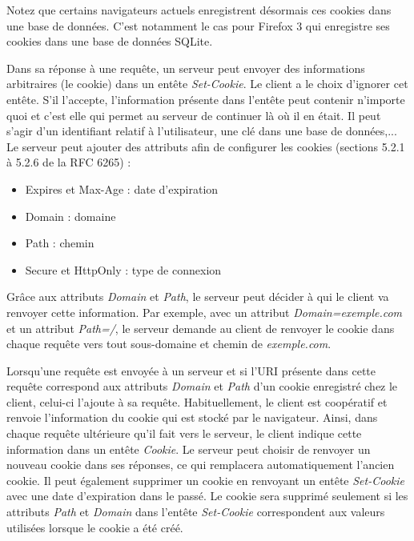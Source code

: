 Notez que certains navigateurs actuels enregistrent désormais ces cookies dans une base de données. C'est notamment le cas pour Firefox 3 qui enregistre ses cookies dans une base de données SQLite.
\newline

Dans sa réponse à une requête, un serveur peut envoyer des informations arbitraires (le cookie) dans un entête \textit{Set-Cookie}. Le client a le choix d'ignorer cet entête. S'il l'accepte, l'information présente dans l'entête peut contenir n'importe quoi et c'est elle qui permet au serveur de continuer là où il en était. Il peut s'agir d'un identifiant relatif à l'utilisateur, une clé dans une base de données,...
Le serveur peut ajouter des attributs afin de configurer les cookies (sections 5.2.1 à 5.2.6 de la RFC 6265) \cite{IETF_RFC6265} :

\begin{itemize}
	\item Expires et Max-Age : date d'expiration
	\item Domain : domaine
	\item Path : chemin
	\item Secure et HttpOnly : type de connexion
	\newline
\end{itemize}

Grâce aux attributs \textit{Domain} et \textit{Path}, le serveur peut décider à qui le client va renvoyer cette information. Par exemple, avec un attribut \textit{Domain=exemple.com} et un attribut \textit{Path=/}, le serveur demande au client de renvoyer le cookie dans chaque requête vers tout sous-domaine et chemin de \textit{exemple.com}.
\newline

Lorsqu'une requête est envoyée à un serveur et si l'URI présente dans cette requête correspond aux attributs \textit{Domain} et \textit{Path} d'un cookie enregistré chez le client, celui-ci l'ajoute à sa requête.
Habituellement, le client est coopératif et renvoie l'information du cookie qui est stocké par le navigateur. Ainsi, dans chaque requête ultérieure qu'il fait vers le serveur, le client indique cette information dans un entête \textit{Cookie}. Le serveur peut choisir de renvoyer un nouveau cookie dans ses réponses, ce qui remplacera automatiquement l'ancien cookie. Il peut également supprimer un cookie en renvoyant un entête \textit{Set-Cookie} avec une date d'expiration dans le passé. Le cookie sera supprimé seulement si les attributs \textit{Path} et \textit{Domain} dans l'entête \textit{Set-Cookie} correspondent aux valeurs utilisées lorsque le cookie a été créé.
\newline

